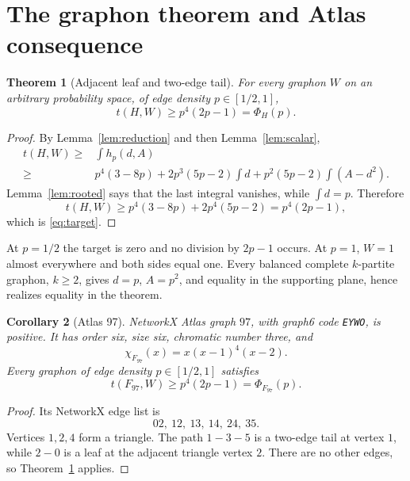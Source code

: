 \documentclass[11pt]{article}
\newtheorem{theorem}{Theorem}[section]
\newtheorem{corollary}[theorem]{Corollary}
\begin{document}
\section{The graphon theorem and Atlas consequence}

\begin{theorem}[Adjacent leaf and two-edge tail]\label{thm:main}
For every graphon $W$ on an arbitrary probability space, of edge density
$p\in[1/2,1]$,
\[
 \boxed{t(H,W)\geq p^4(2p-1)=\Phi_H(p).}
\]
\end{theorem}

\begin{proof}
By Lemma~\ref{lem:reduction} and then Lemma~\ref{lem:scalar},
\begin{align*}
 t(H,W)
 \geq{}&\int h_p(d,A)\\
 \geq{}&p^4(3-8p)+2p^3(5p-2)\int d
 +p^2(5p-2)\int(A-d^2).
\end{align*}
Lemma~\ref{lem:rooted} says that the last integral vanishes, while
$\int d=p$.  Therefore
\[
 t(H,W)\geq p^4(3-8p)+2p^4(5p-2)=p^4(2p-1),
\]
which is \eqref{eq:target}.
\end{proof}

At $p=1/2$ the target is zero and no division by $2p-1$ occurs.  At $p=1$,
$W=1$ almost everywhere and both sides equal one.  Every balanced complete
$k$-partite graphon, $k\geq2$, gives $d=p$, $A=p^2$, and equality in the
supporting plane, hence realizes equality in the theorem.

\begin{corollary}[Atlas 97]\label{cor:atlas97}
NetworkX Atlas graph $97$, with graph6 code \texttt{EYWO}, is positive.  It
has order six, size six, chromatic number three, and
\[
 \chi_{F_{97}}(x)=x(x-1)^4(x-2).
\]
Every graphon of edge density $p\in[1/2,1]$ satisfies
\[
 t(F_{97},W)\geq p^4(2p-1)=\Phi_{F_{97}}(p).
\]
\end{corollary}

\begin{proof}
Its NetworkX edge list is
\[
 02,\ 12,\ 13,\ 14,\ 24,\ 35.
\]
Vertices $1,2,4$ form a triangle.  The path $1-3-5$ is a two-edge tail at
vertex $1$, while $2-0$ is a leaf at the adjacent triangle vertex $2$.
There are no other edges, so Theorem~\ref{thm:main} applies.
\end{proof}


\end{document}
